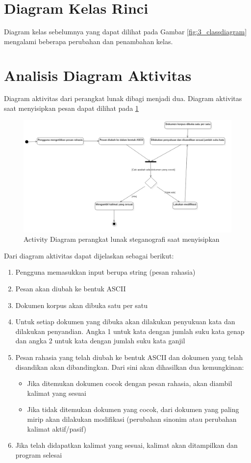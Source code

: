 \section{Diagram Kelas Rinci}

Diagram kelas sebelumnya yang dapat dilihat pada Gambar \ref{fig:3_classdiagram} mengalami beberapa perubahan dan penambahan kelas.

\section{Analisis Diagram Aktivitas}

Diagram aktivitas dari perangkat lunak dibagi menjadi dua. Diagram aktivitas saat menyisipkan pesan dapat dilihat pada \ref{fig:4_activity-penyisipan}

\begin{figure}[H]
	\centering
	\includegraphics[scale=0.5]{Gambar/activity-penyisipan}
	\caption{Activity Diagram perangkat lunak steganografi saat menyisipkan} 
	\label{fig:4_activity-penyisipan}
\end{figure}

Dari diagram aktivitas dapat dijelaskan sebagai berikut:

\begin{enumerate}
	\item Pengguna memasukkan input berupa string (pesan rahasia)
	\item Pesan akan diubah ke bentuk ASCII
	\item Dokumen korpus akan dibuka satu per satu
	\item Untuk setiap dokumen yang dibuka akan dilakukan penyukuan kata dan dilakukan penyandian. Angka 1 untuk kata dengan jumlah suku kata genap dan angka 2 untuk kata dengan jumlah suku kata ganjil
	\item Pesan rahasia yang telah diubah ke bentuk ASCII dan dokumen yang telah disandikan akan dibandingkan. Dari sini akan dihasilkan dua kemungkinan:
	\begin{itemize}
		\item Jika ditemukan dokumen cocok dengan pesan rahasia, akan diambil kalimat yang sesuai
		\item Jika tidak ditemukan dokumen yang cocok, dari dokumen yang paling mirip akan dilakukan modifikasi (perubahan sinonim atau perubahan kalimat aktif/pasif)
	\end{itemize}
	\item Jika telah didapatkan kalimat yang sesuai, kalimat akan ditampilkan dan program selesai
\end{enumerate}

